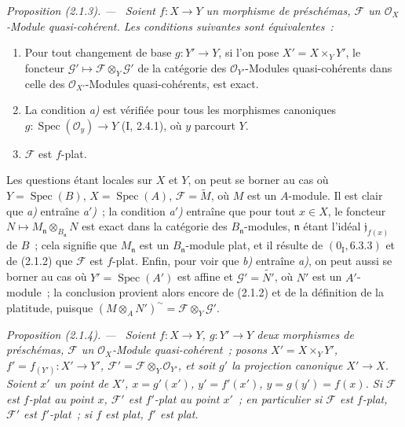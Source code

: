 \documentclass[10pt,oneside]{book}
\newcommand{\oldpage}[2][]{%
  \setcounter{footnote}{0}%
  \marginpar{\scriptsize\textbf{#1}~|~#2}\ignorespaces}
\newenvironment{proposition}[1][]{%
  \par\medskip\noindent\itshape Proposition (#1). ---\ }{\par}
\begin{document}
\oldpage[IV-2]{6}
\begin{proposition}[2.1.3]
\label{IV.2.1.3-fr}
Soient $f:X\to Y$ un morphisme de préschémas, $\mathscr F$ un
$\mathcal O_X$-Module quasi-cohérent. Les conditions suivantes sont
équivalentes~:
\begin{enumerate}
\item[\emph{a)}] Pour tout changement de base $g:Y'\to Y$, si l'on pose
$X'=X\times_Y Y'$, le foncteur
$\mathscr G'\mapsto\mathscr F\otimes_Y\mathscr G'$ de la catégorie des
$\mathcal O_{Y'}$-Modules quasi-cohérents dans celle des
$\mathcal O_{X'}$-Modules quasi-cohérents, est exact.
\item[\emph{a$'$)}] La condition \emph{a)} est vérifiée pour tous les
morphismes canoniques $g:\operatorname{Spec}(\mathcal O_y)\to Y$ (I, 2.4.1),
où $y$ parcourt $Y$.
\item[\emph{b)}] $\mathscr F$ est $f$-plat.
\end{enumerate}
\end{proposition}

Les questions étant locales sur $X$ et $Y$, on peut se borner au cas où
$Y=\operatorname{Spec}(B)$, $X=\operatorname{Spec}(A)$,
$\mathscr F=\widetilde M$, où $M$ est un $A$-module. Il est clair que
\emph{a)} entraîne \emph{a$'$)}~; la condition \emph{a$'$)} entraîne que
pour tout $x\in X$, le foncteur $N\mapsto M_{\mathfrak n}\otimes_{B_{\mathfrak n}}N$
est exact dans la catégorie des $B_{\mathfrak n}$-modules, $\mathfrak n$
étant l'idéal $\mathfrak j_{f(x)}$ de $B$~; cela signifie que
$M_{\mathfrak n}$ est un $B_{\mathfrak n}$-module plat, et il résulte de
$(0_{\mathrm I},6.3.3)$ et de (2.1.2) que $\mathscr F$ est $f$-plat. Enfin,
pour voir que \emph{b)} entraîne \emph{a)}, on peut aussi se borner au cas où
$Y'=\operatorname{Spec}(A')$ est affine et $\mathscr G'=\widetilde{N'}$, où
$N'$ est un $A'$-module~; la conclusion provient alors encore de (2.1.2) et
de la définition de la platitude, puisque
$(M\otimes_A N')^{\sim}=\mathscr F\otimes_Y\mathscr G'$.

\begin{proposition}[2.1.4]
\label{IV.2.1.4-fr}
Soient $f:X\to Y$, $g:Y'\to Y$ deux morphismes de préschémas, $\mathscr F$
un $\mathcal O_X$-Module quasi-cohérent~; posons $X'=X\times_Y Y'$,
$f'=f_{(Y')}:X'\to Y'$, $\mathscr F'=\mathscr F\otimes_Y\mathcal O_{Y'}$,
et soit $g'$ la projection canonique $X'\to X$. Soient $x'$ un point de
$X'$, $x=g'(x')$, $y'=f'(x')$, $y=g(y')=f(x)$. Si $\mathscr F$ est $f$-plat
au point $x$, $\mathscr F'$ est $f'$-plat au point $x'$~; en particulier si
$\mathscr F$ est $f$-plat, $\mathscr F'$ est $f'$-plat~; si $f$ est plat,
$f'$ est plat.
\end{proposition}
\end{document}
